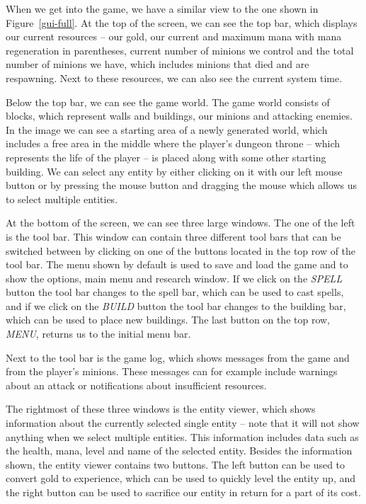When we get into the game, we have a similar view to the one shown in Figure~\ref{gui-full}. At the top of the screen, we can see the top
bar, which displays our current resources -- our gold, our current and maximum mana with mana regeneration in parentheses, current number
of minions we control and the total number of minions we have, which includes minions that died and are respawning. Next to these resources,
we can also see the current system time.

Below the top bar, we can see the game world. The game world consists of blocks, which represent walls and buildings, our minions and
attacking enemies. In the image we can see a starting area of a newly generated world, which includes a free area in the middle where
the player's dungeon throne -- which represents the life of the player -- is placed along with some other starting building. We can select
any entity by either clicking on it with our left mouse button or by pressing the mouse button and dragging the mouse which allows us
to select multiple entities.

At the bottom of the screen, we can see three large windows. The one of the left is the tool bar. This window can contain three different
tool bars that can be switched between by clicking on one of the buttons located in the top row of the tool bar. The menu shown by default
is used to save and load the game and to show the options, main menu and research window. If we click on the \emph{SPELL} button the tool bar
changes to the spell bar, which can be used to cast spells, and if we click on the \emph{BUILD} button the tool bar changes to the building
bar, which can be used to place new buildings. The last button on the top row, \emph{MENU}, returns us to the initial menu bar.

Next to the tool bar is the game log, which shows messages from the game and from the player's minions. These messages can for example include
warnings about an attack or notifications about insufficient resources.

The rightmost of these three windows is the entity viewer, which shows information about the currently selected single entity -- note that
it will not show anything when we select multiple entities. This information includes data such as the health, mana, level and name of the
selected entity. Besides the information shown, the entity viewer contains two buttons. The left button can be used to convert gold to
experience, which can be used to quickly level the entity up, and the right button can be used to sacrifice our entity in return for a part
of its cost.

